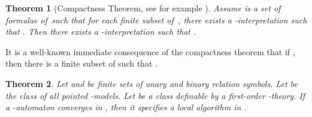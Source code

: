 \documentclass[copyright,creativecommons]{eptcs}
\newtheorem{theorem}{Theorem}[section]
\begin{document}
\begin{theorem}[Compactness Theorem, see for example \cite{ebbinghaus}]
Assume  is a set of formulae of\,   such that for each finite
subset  of\, , there exists a -interpretation  such that .
Then there exists a  -interpretation  such that .
\end{theorem}




It is a well-known immediate consequence of the compactness theorem that if ,
then there is a finite subset  of  such that .




\begin{theorem}\label{maintheorem}
Let  and  be finite sets of unary
and binary relation symbols.
Let  be the class of all pointed -models. Let 
be a class definable by a first-order -theory.
If a -automaton converges in , then it
specifies a local algorithm in .
\end{theorem}
\end{document}
